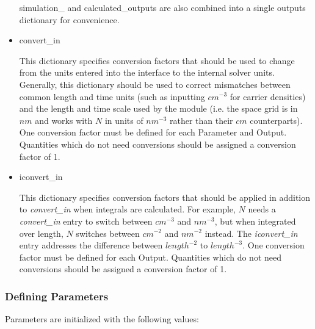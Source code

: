 \documentclass[11pt,letterpaper,titlepage]{article}
\begin{document}
\begin{itemize}
			\par simulation\_ and calculated\_outputs are also combined into a single outputs dictionary for convenience.
			
			\item convert\_in
			\par This dictionary specifies conversion factors that should be used to change from the units entered into the interface to the internal solver units. Generally, this dictionary should be used to correct mismatches between common length and time units (such as inputting $cm^{-3}$ for carrier densities) and the length and time scale used by the module (i.e. the space grid is in $nm$ and works with $N$ in units of $nm^{-3}$ rather than their $cm$ counterparts). One conversion factor must be defined for each Parameter and Output. Quantities which do not need conversions should be assigned a conversion factor of 1.
			
			\item iconvert\_in
			\par This dictionary specifies conversion factors that should be applied in addition to \textit{convert\_in} when integrals are calculated. For example, $N$ needs a \textit{convert\_in} entry to switch between $cm^{-3}$ and $nm^{-3}$, but when integrated over length, $N$ switches between $cm^{-2}$ and $nm^{-2}$ instead. The \textit{iconvert\_in} entry addresses the difference between $length^{-2}$ to $length^{-3}$. One conversion factor must be defined for each Output. Quantities which do not need conversions should be assigned a conversion factor of 1.
		\end{itemize}
	
		\subsubsection{Defining Parameters}
		\par Parameters are initialized with the following values:
		
\end{document}
